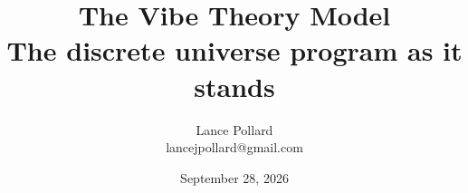\onehalfspacing

\theoremheaderfont{\bfseries}
\theorembodyfont{\normalfont}
\newtheorem{definition}{Definition}
\newtheorem{theorem}{Theorem}
\newtheorem{result}{Result}

\makeatletter
\def\@begintheorem#1#2#3{%
  \par\addvspace{0.5em}%
  \noindent\textbf{#1 #2.}
  \ifx\@empty#3\relax
    \quad
  \else
    \ \textbf{#3:}
  \fi
  \hspace{0.5em}
}
\def\@endtheorem{\par}
\makeatother

\newcommand{\code}[1]{\texttt{#1}}

\title{
  {\huge \textbf{The Vibe Theory Model}} \\[3mm]
  \large The discrete universe program as it stands
}
\author{Lance Pollard \\ \small lancejpollard@gmail.com}
\date{September 28, 2026}
